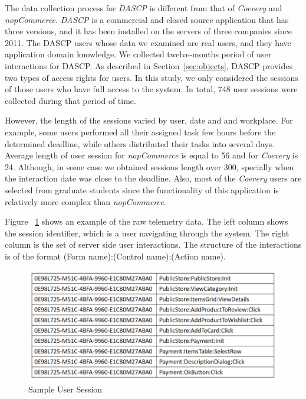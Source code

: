 The data collection process for {\em DASCP} is different from that of {\em Coevery} 
and {\em nopCommerce}. {\em DASCP} is a commercial and closed source application 
that has three versions, and it has been installed on the servers of three companies since 2011. 
The DASCP users whose data we examined are real users, and they have application domain knowledge.
We collected twelve-months period of user interactions for DASCP.
As described in Section~\ref{sec:objects}, DASCP provides two types of access rights for users.
In this study, we only considered the sessions of those users who have full access to the system.
In total, 748 user sessions were collected during that period of time. 

However, the length of the sessions varied by user, date and and workplace.
For example, some users performed all their assigned task few hours before the
determined deadline, while others distributed their tasks into several days.
Average length of user session for {\em nopCommerce} is equal to 56 and for
{\em Coevery} is 24. Although, in some case we obtained sessions length over 
300, specially when the interaction date was close to the deadline. 
Also, most of the {\em Coevery} users are selected from graduate students since the
functionality of this application is relatively more complex than {\em nopCommerce}. 

Figure ~\ref{fig:SampleSession3} shows an example of the raw telemetry data. 
The left column shows the session identifier, which is a user
navigating through the system. The right column is the set of server side user interactions. The structure of the interactions is of the format (Form name):(Control name):(Action name).

\begin{figure}[!ht]
	\centering
	\includegraphics[width=0.90\linewidth]{./SessionSample3.png}
	\vspace*{3pt}
	\caption{Sample User Session}
	\label{fig:SampleSession3}
	\vspace*{5pt}
\end{figure}


